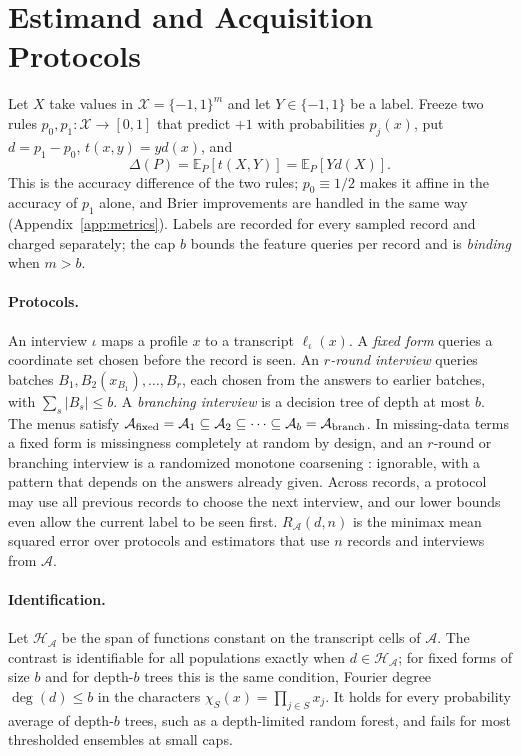 \documentclass{article}
\newcommand{\E}{\mathbb{E}}
\newcommand{\X}{\mathcal X}
\newcommand{\A}{\mathcal A}
\newcommand{\Hh}{\mathcal H}
\begin{document}
\section{Estimand and Acquisition Protocols}\label{sec:setup}
Let $X$ take values in $\X=\{-1,1\}^m$ and let $Y\in\{-1,1\}$ be a label. Freeze two rules $p_0,p_1:\X\to[0,1]$ that predict $+1$ with probabilities $p_j(x)$, put $d=p_1-p_0$, $t(x,y)=yd(x)$, and
\begin{equation}
 \Delta(P)=\E_P[t(X,Y)]=\E_P[Yd(X)].\label{eq:gain}
\end{equation}
This is the accuracy difference of the two rules; $p_0\equiv1/2$ makes it affine in the accuracy of $p_1$ alone, and Brier improvements are handled in the same way (Appendix~\ref{app:metrics}). Labels are recorded for every sampled record and charged separately; the cap $b$ bounds the feature queries per record and is \emph{binding} when $m>b$.

\paragraph{Protocols.}
An interview $\iota$ maps a profile $x$ to a transcript $\ell_\iota(x)$. A \emph{fixed form} queries a coordinate set chosen before the record is seen. An \emph{$r$-round interview} queries batches $B_1,B_2(x_{B_1}),\ldots,B_r$, each chosen from the answers to earlier batches, with $\sum_s|B_s|\le b$. A \emph{branching interview} is a decision tree of depth at most $b$. The menus satisfy $\A_{\rm fixed}=\A_1\subseteq\A_2\subseteq\cdots\subseteq\A_b=\A_{\rm branch}$. In missing-data terms a fixed form is missingness completely at random by design, and an $r$-round or branching interview is a randomized monotone coarsening \citep{gill1997}: ignorable, with a pattern that depends on the answers already given. Across records, a protocol may use all previous records to choose the next interview, and our lower bounds even allow the current label to be seen first. $R_\A(d,n)$ is the minimax mean squared error over protocols and estimators that use $n$ records and interviews from $\A$.

\paragraph{Identification.}
Let $\Hh_\A$ be the span of functions constant on the transcript cells of $\A$. The contrast is identifiable for all populations exactly when $d\in\Hh_\A$; for fixed forms of size $b$ and for depth-$b$ trees this is the same condition, Fourier degree $\deg(d)\le b$ in the characters $\chi_S(x)=\prod_{j\in S}x_j$. It holds for every probability average of depth-$b$ trees, such as a depth-limited random forest, and fails for most thresholded ensembles at small caps.
\end{document}
